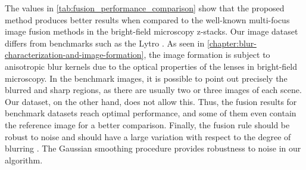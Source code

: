 The values in \autoref{tab:fusion_performance_comparison} show that the proposed method produces better results when compared to the well-known multi-focus image fusion methods in the bright-field microscopy z-stacks. Our image dataset differs from benchmarks such as the Lytro \cite{nejati2015multi}. As seen in \autoref{chapter:blur-characterization-and-image-formation}, the image formation is subject to anisotropic blur kernels due to the optical properties of the lenses in bright-field microscopy. In the benchmark images, it is possible to point out precisely the blurred and sharp regions, as there are usually two or three images of each scene. Our dataset, on the other hand, does not allow this. Thus, the fusion results for benchmark datasets reach optimal performance, and some of them even contain the reference image for a better comparison. Finally, the fusion rule should be robust to noise and should have a large variation with respect to the degree of blurring \cite{huang2007evaluation}. The Gaussian smoothing procedure provides robustness to noise in our algorithm. 